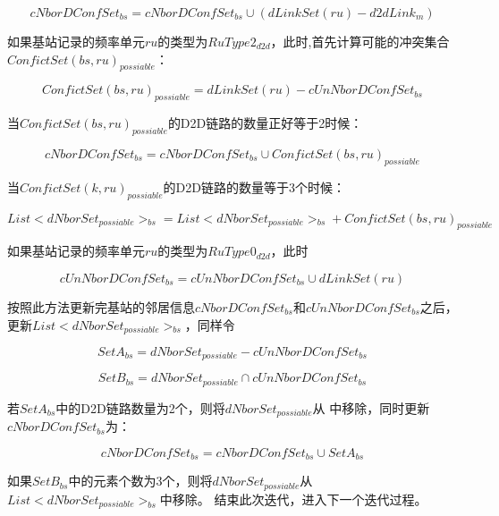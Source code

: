 \documentclass[figurelist,tablelist,algorithmlist,nomlist,masters]{seuthesix}
\begin{document}
\begin{enumerate}
	\begin{equation}\label{eq2.1}
	cNborDConfSe{t_{bs}} = cNborDConfSe{t_{bs}} \cup (dLinkSet(ru) - d2dLin{k_m})
	\end{equation}
	
	如果基站记录的频率单元$ru$的类型为$RuType{2_{d2d}}$，此时,首先计算可能的冲突集合$ConfictSet{(bs,ru)_{possiable}}$：
	
	\begin{equation}\label{eq2.1}
	ConfictSet{(bs,ru)_{possiable}} = dLinkSet(ru) - cUnNborDConfSe{t_{bs}}
	\end{equation}
	
	
	当$ConfictSet{(bs,ru)_{possiable}}$的D2D链路的数量正好等于2时候：
	
	\begin{equation}\label{eq2.1}
	cNborDConfSe{t_{bs}} = cNborDConfSe{t_{bs}} \cup ConfictSet{(bs,ru)_{possiable}}
	\end{equation}
	
	当$ConfictSet{(k,ru)_{possiable}}$的D2D链路的数量等于3个时候：
	
	\begin{equation}\label{eq2.1}
	List < dNborSe{t_{possiable}}{ > _{bs}} = List < dNborSe{t_{possiable}}{ > _{bs}} + ConfictSet{(bs,ru)_{possiable}}
	\end{equation}
	
	
	如果基站记录的频率单元$ru$的类型为$RuType{0_{d2d}}$，此时
	
	\begin{equation}\label{eq2.1}
	cUnNborDConfSe{t_{bs}} = cUnNborDConfSe{t_{bs}} \cup dLinkSet(ru)
	\end{equation}
	
	按照此方法更新完基站的邻居信息$cNborDConfSe{t_{bs}}$和$cUnNborDConfSe{t_{bs}}$之后，更新$List < dNborSe{t_{possiable}}{ > _{bs}}$，同样令
	
	\begin{equation}\label{eq2.1}
	Set{A_{bs}} = dNborSe{t_{possiable}} - cUnNborDConfSe{t_{bs}}
	\end{equation}
	
	\begin{equation}\label{eq2.1}
	Set{B_{bs}} = dNborSe{t_{possiable}} \cap cUnNborDConfSe{t_{bs}}
	\end{equation}
	
	若$Set{A_{bs}}$中的D2D链路数量为2个，则将$dNborSe{t_{possiable}}$从 中移除，同时更新$cNborDConfSe{t_{bs}}$为：
	
	\begin{equation}\label{eq2.1}
	cNborDConfSe{t_{bs}} = cNborDConfSe{t_{bs}} \cup Set{A_{bs}}
	\end{equation}
	
	如果$Set{B_{bs}}$中的元素个数为3个，则将$dNborSe{t_{possiable}}$从$List < dNborSe{t_{possiable}}{ > _{bs}}$中移除。 
	结束此次迭代，进入下一个迭代过程。
	
	\end{enumerate}
	
\end{document}
